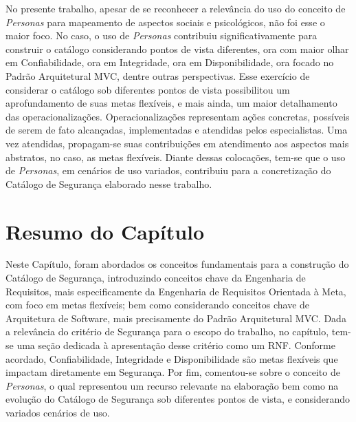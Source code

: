 No presente trabalho, apesar de se reconhecer a relevância do uso do conceito de \textit{Personas} para mapeamento de aspectos sociais e psicológicos, não foi esse o maior foco. No caso, o uso de \textit{Personas} contribuiu significativamente para construir o catálogo considerando pontos de vista diferentes, ora com maior olhar em Confiabilidade, ora em Integridade, ora em Disponibilidade, ora focado no Padrão Arquitetural MVC, dentre outras perspectivas. Esse exercício de considerar o catálogo sob diferentes pontos de vista possibilitou um aprofundamento de suas metas flexíveis, e mais ainda, um maior detalhamento das operacionalizações. Operacionalizações representam ações concretas, possíveis de serem de fato alcançadas, implementadas e atendidas pelos especialistas. Uma vez atendidas, propagam-se suas contribuições em atendimento aos aspectos mais abstratos, no caso, as metas flexíveis. Diante dessas colocações, tem-se que o uso de \textit{Personas}, em cenários de uso variados, contribuiu para a concretização do Catálogo de Segurança elaborado nesse trabalho.


\section*{Resumo do Capítulo}

Neste Capítulo, foram abordados os conceitos fundamentais para a construção do Catálogo de Segurança, introduzindo conceitos chave da Engenharia de Requisitos, mais especificamente da Engenharia de Requisitos Orientada à Meta, com foco em metas flexíveis; bem como considerando conceitos chave de Arquitetura de Software, mais precisamente do Padrão Arquitetural MVC.
Dada a relevância do critério de Segurança para o escopo do trabalho, no capítulo, tem-se uma seção dedicada à apresentação desse critério como um RNF. Conforme acordado, Confiabilidade, Integridade e Disponibilidade são metas flexíveis que impactam diretamente em Segurança. Por fim, comentou-se sobre o conceito de \textit{Personas}, o qual representou um recurso relevante na elaboração bem como na evolução do Catálogo de Segurança sob diferentes pontos de vista, e considerando variados cenários de uso. 
 




